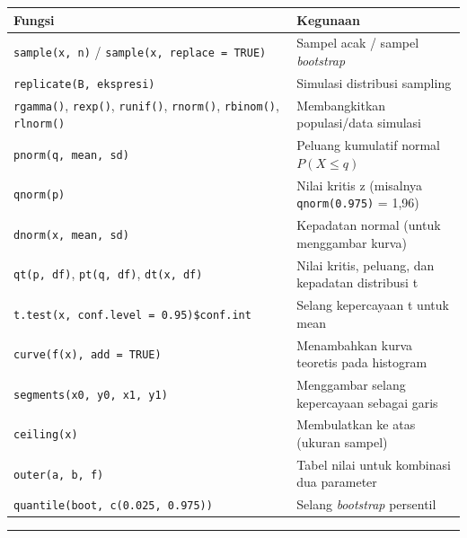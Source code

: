 \documentclass[
  indonesian,
  letterpaper,
]{book}
\newcounter{none} %
\begin{document}
{\def\LTcaptype{none} %
\begin{longtable}[]{@{}
  >{\raggedright\arraybackslash}p{}
  >{\raggedright\arraybackslash}p{}@{}}
\toprule\noalign{}
\begin{minipage}[b]{\linewidth}\raggedright
Fungsi
\end{minipage} & \begin{minipage}[b]{\linewidth}\raggedright
Kegunaan
\end{minipage} \\
\midrule\noalign{}
\endhead
\bottomrule\noalign{}
\endlastfoot
\texttt{sample(x,\ n)} / \texttt{sample(x,\ replace\ =\ TRUE)} & Sampel
acak / sampel \emph{bootstrap} \\
\texttt{replicate(B,\ ekspresi)} & Simulasi distribusi sampling \\
\texttt{rgamma()}, \texttt{rexp()}, \texttt{runif()}, \texttt{rnorm()},
\texttt{rbinom()}, \texttt{rlnorm()} & Membangkitkan populasi/data
simulasi \\
\texttt{pnorm(q,\ mean,\ sd)} & Peluang kumulatif normal
\(P(X \leq q)\) \\
\texttt{qnorm(p)} & Nilai kritis z (misalnya \texttt{qnorm(0.975)} =
1,96) \\
\texttt{dnorm(x,\ mean,\ sd)} & Kepadatan normal (untuk menggambar
kurva) \\
\texttt{qt(p,\ df)}, \texttt{pt(q,\ df)}, \texttt{dt(x,\ df)} & Nilai
kritis, peluang, dan kepadatan distribusi t \\
\texttt{t.test(x,\ conf.level\ =\ 0.95)\$conf.int} & Selang kepercayaan
t untuk mean \\
\texttt{curve(f(x),\ add\ =\ TRUE)} & Menambahkan kurva teoretis pada
histogram \\
\texttt{segments(x0,\ y0,\ x1,\ y1)} & Menggambar selang kepercayaan
sebagai garis \\
\texttt{ceiling(x)} & Membulatkan ke atas (ukuran sampel) \\
\texttt{outer(a,\ b,\ f)} & Tabel nilai untuk kombinasi dua parameter \\
\texttt{quantile(boot,\ c(0.025,\ 0.975))} & Selang \emph{bootstrap}
persentil \\
\end{longtable}
}

\begin{center}\rule{0.5\linewidth}{0.5pt}\end{center}
\end{document}
